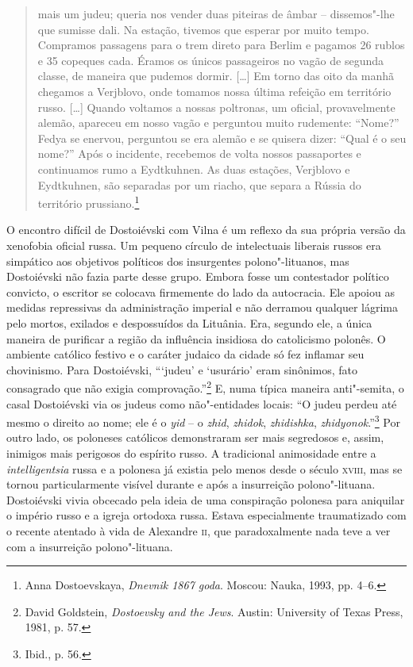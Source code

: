 \begin{quote}
mais um judeu; queria nos vender duas piteiras de âmbar -- dissemos"-lhe
que sumisse dali. Na estação, tivemos que esperar por muito tempo.
Compramos passagens para o trem direto para Berlim e pagamos 26 rublos e
35 copeques cada. Éramos os únicos passageiros no vagão de segunda
classe, de maneira que pudemos dormir. [\ldots{}] Em torno das oito da
manhã chegamos a Verjblovo, onde tomamos nossa última refeição em
território russo. [\ldots{}] Quando voltamos a nossas poltronas, um
oficial, provavelmente alemão, apareceu em nosso vagão e perguntou muito
rudemente: ``Nome?'' Fedya se enervou, perguntou se era alemão e se
quisera dizer: ``Qual é o seu nome?'' Após o incidente, recebemos de
volta nossos passaportes e continuamos rumo a Eydtkuhnen. As duas
estações, Verjblovo e Eydtkuhnen, são separadas por um riacho, que
separa a Rússia do território prussiano.\footnote{Anna Dostoevskaya, \textit{Dnevnik 1867 goda}. Moscou: Nauka, 1993, pp. 4--6.} 
\end{quote}

O encontro difícil de Dostoiévski com Vilna é um reflexo da sua própria
versão da xenofobia oficial russa. Um pequeno círculo de intelectuais
liberais russos era simpático aos objetivos políticos dos insurgentes
polono"-lituanos, mas Dostoiévski não fazia parte desse grupo. Embora
fosse um contestador político convicto, o escritor se colocava
firmemente do lado da autocracia. Ele apoiou as medidas repressivas da
administração imperial e não derramou qualquer lágrima pelo mortos,
exilados e despossuídos da Lituânia. Era, segundo ele, a única maneira
de purificar a região da influência insidiosa do catolicismo polonês. O
ambiente católico festivo e o caráter judaico da cidade só fez inflamar
seu chovinismo. Para Dostoiévski, ```judeu' e `usurário' eram sinônimos,
fato consagrado que não exigia comprovação.''\footnote{David Goldstein, \textit{Dostoevsky and the Jews}. Austin: University of Texas Press, 1981, p. 57.} E, numa típica maneira anti"-semita, o casal Dostoiévski via os judeus como não"-entidades locais: ``O judeu perdeu até
mesmo o direito ao nome; ele é o \textit{yid} -- o \textit{zhid}, \textit{zhidok},
\textit{zhidishka}, \textit{zhidyonok}.''\footnote{Ibid., p. 56.} Por outro
lado, os poloneses católicos demonstraram ser mais segredosos e, assim,
inimigos mais perigosos do espírito russo. A tradicional animosidade
entre a \textit{intelligentsia} russa e a polonesa já existia pelo menos
desde o século \textsc{xviii}, mas se tornou particularmente visível durante e após
a insurreição polono"-lituana. Dostoiévski vivia obcecado pela ideia de
uma conspiração polonesa para aniquilar o império russo e a igreja
ortodoxa russa. Estava especialmente traumatizado com o recente atentado
à vida de Alexandre \textsc{ii}, que paradoxalmente nada teve a ver com a
insurreição polono"-lituana.

